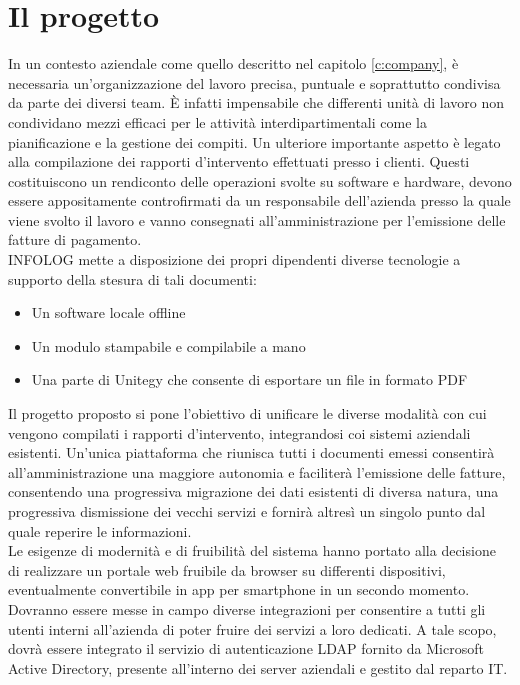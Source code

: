 \chapter{Il progetto}\label{c:project}

In un contesto aziendale come quello descritto nel capitolo \ref{c:company}, è necessaria un'organizzazione del lavoro precisa, puntuale e soprattutto condivisa da parte dei diversi team.
È infatti impensabile che differenti unità di lavoro non condividano mezzi efficaci per le attività interdipartimentali come la pianificazione e la gestione dei compiti.
Un ulteriore importante aspetto è legato alla compilazione dei rapporti d'intervento effettuati presso i clienti.
Questi costituiscono un rendiconto delle operazioni svolte su software e hardware, devono essere appositamente controfirmati da un responsabile dell'azienda presso la quale viene svolto il lavoro
e vanno consegnati all'amministrazione per l'emissione delle fatture di pagamento.
\\
INFOLOG mette a disposizione dei propri dipendenti diverse tecnologie a supporto della stesura di tali documenti:
\begin{itemize}
    \item Un software locale offline
    \item Un modulo stampabile e compilabile a mano
    \item Una parte di Unitegy che consente di esportare un file in formato PDF
\end{itemize}
Il progetto proposto si pone l'obiettivo di unificare le diverse modalità con cui vengono compilati i rapporti d'intervento, integrandosi coi sistemi aziendali esistenti.
Un'unica piattaforma che riunisca tutti i documenti emessi consentirà all'amministrazione una maggiore autonomia e faciliterà l'emissione delle fatture, consentendo una progressiva
migrazione dei dati esistenti di diversa natura, una progressiva dismissione dei vecchi servizi e fornirà altresì un singolo punto dal quale reperire le informazioni.
\\
Le esigenze di modernità e di fruibilità del sistema hanno portato alla decisione di realizzare un portale web fruibile da browser su differenti dispositivi, eventualmente
convertibile in app per smartphone in un secondo momento.
Dovranno essere messe in campo diverse integrazioni per consentire a tutti gli utenti interni all'azienda di poter fruire dei servizi a loro dedicati.
A tale scopo, dovrà essere integrato il servizio di autenticazione LDAP fornito da Microsoft Active Directory, presente all'interno dei server aziendali e gestito dal reparto IT.
